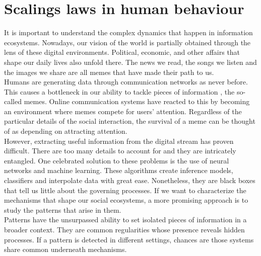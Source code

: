 \section{Scalings laws in human behaviour}\label{chp:methods:scaling}
It is important to understand the complex dynamics that happen in information ecosystems. Nowadays, our vision of the world is partially obtained through the lens of these digital environments. Political, economic, and other affairs that shape our daily lives also unfold there. The news we read, the songs we listen and the images we share are all memes that have made their path to us.\\

Humans are generating data through communication networks as never before. This causes a bottleneck in our ability to tackle pieces of information \cite{lorenz2019accelerating}, the so-called memes. Online communication systems have reacted to this by becoming an environment where memes compete for users' attention. Regardless of the particular details of the social interaction, the survival of a meme can be thought of as depending on attracting attention.\\

However, extracting useful information from the digital stream has proven difficult. There are too many details to account for and they are intricately entangled. One celebrated solution to these problems is the use of neural networks and machine learning. These algorithms create inference models, classifiers and interpolate data with great ease. Nonetheless, they are black boxes that tell us little about the governing processes. If we want to characterize the mechanisms that shape our social ecosystems, a more promising approach is to study the patterns that arise in them.\\

Patterns have the unsurpassed ability to set isolated pieces of information in a broader context. They are common regularities whose presence reveals hidden processes. If a pattern is detected in different settings, chances are those systems share common underneath mechanisms. \\

